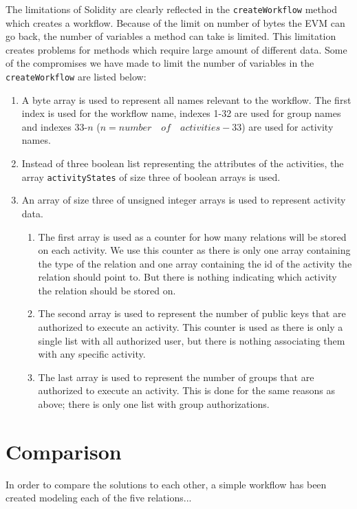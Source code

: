 \documentclass{article}
\begin{document}
	The limitations of Solidity are clearly reflected in the \texttt{createWorkflow} method which creates a workflow. 
	Because of the limit on number of bytes the EVM can go back, the number of variables a method can take is limited. 
	This limitation creates problems for methods which require large amount of different data. 
	Some of the compromises we have made to limit the number of variables in the \texttt{createWorkflow} are listed below:
	\begin{enumerate}
		\item A byte array is used to represent all names relevant to the workflow. The first index is used for the workflow name, indexes 1-32 are used for group names and indexes 33-$n$ ($n = number \quad of \quad activities - 33$) are used for activity names.
		\item Instead of three boolean list representing the attributes of the activities, the array \texttt{activityStates} of size three of boolean arrays is used.
		\item An array of size three of unsigned integer arrays is used to represent activity data. 
		\begin{enumerate}
			\item The first array is used as a counter for how many relations will be stored on each activity. We use this counter as there is only one array containing the type of the relation and one array containing the id of the activity the relation should point to. But there is nothing indicating which activity the relation should be stored on.
			\item The second array is used to represent the number of public keys that are authorized to execute an activity. This counter is used as there is only a single list with all authorized user, but there is nothing associating them with any specific activity.
			\item The last array is used to represent the number of groups that are authorized to execute an activity. This is done for the same reasons as above; there is only one list with group authorizations.
		\end{enumerate}
	\end{enumerate}

	\section{Comparison}
	\label{sec:comparison}
	In order to compare the solutions to each other, a simple workflow has been created modeling each of the five relations...
\end{document}
